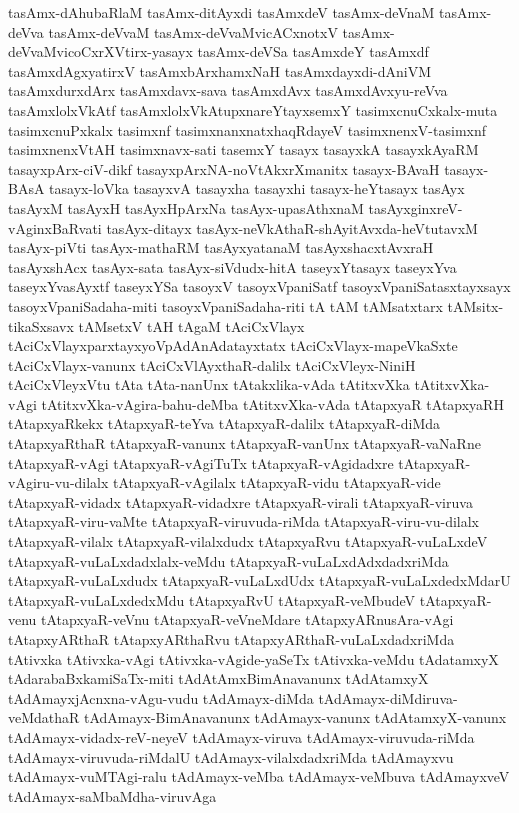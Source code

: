 {tasAmx-dAhubaRlaM
tasAmx-ditAyxdi
tasAmxdeV
tasAmx-deVnaM
tasAmx-deVva
tasAmx-deVvaM
tasAmx-deVvaMvicACxnotxV
tasAmx-deVvaMvicoCxrXVtirx-yasayx
tasAmx-deVSa
tasAmxdeY
tasAmxdf
tasAmxdAgxyatirxV
tasAmxbArxhamxNaH
tasAmxdayxdi-dAniVM
tasAmxdurxdArx
tasAmxdavx-sava
tasAmxdAvx
tasAmxdAvxyu-reVva
tasAmxlolxVkAtf
tasAmxlolxVkAtupxnareYtayxsemxY
tasimxcnuCxkalx-muta
tasimxcnuPxkalx
tasimxnf
tasimxnanxnatxhaqRdayeV
tasimxnenxV-tasimxnf
tasimxnenxVtAH
tasimxnavx-sati
tasemxY
tasayx
tasayxkA
tasayxkAyaRM
tasayxpArx-ciV-dikf
tasayxpArxNA-noVtAkxrXmanitx
tasayx-BAvaH
tasayx-BAsA
tasayx-loVka
tasayxvA
tasayxha
tasayxhi
tasayx-heYtasayx
tasAyx
tasAyxM
tasAyxH
tasAyxHpArxNa
tasAyx-upasAthxnaM
tasAyxginxreV-vAginxBaRvati
tasAyx-ditayx
tasAyx-neVkAthaR-shAyitAvxda-heVtutavxM
tasAyx-piVti
tasAyx-mathaRM
tasAyxyatanaM
tasAyxshacxtAvxraH
tasAyxshAcx
tasAyx-sata
tasAyx-siVdudx-hitA
taseyxYtasayx
taseyxYva
taseyxYvasAyxtf
taseyxYSa
tasoyxV
tasoyxVpaniSatf
tasoyxVpaniSatasxtayxsayx
tasoyxVpaniSadaha-miti
tasoyxVpaniSadaha-riti
tA
tAM
tAMsatxtarx
tAMsitx-tikaSxsavx
tAMsetxV
tAH
tAgaM
tAciCxVlayx
tAciCxVlayxparxtayxyoVpAdAnAdatayxtatx
tAciCxVlayx-mapeVkaSxte
tAciCxVlayx-vanunx
tAciCxVlAyxthaR-dalilx
tAciCxVleyx-NiniH
tAciCxVleyxVtu
tAta
tAta-nanUnx
tAtakxlika-vAda
tAtitxvXka
tAtitxvXka-vAgi
tAtitxvXka-vAgira-bahu-deMba
tAtitxvXka-vAda
tAtapxyaR
tAtapxyaRH
tAtapxyaRkekx
tAtapxyaR-teYva
tAtapxyaR-dalilx
tAtapxyaR-diMda
tAtapxyaRthaR
tAtapxyaR-vanunx
tAtapxyaR-vanUnx
tAtapxyaR-vaNaRne
tAtapxyaR-vAgi
tAtapxyaR-vAgiTuTx
tAtapxyaR-vAgidadxre
tAtapxyaR-vAgiru-vu-dilalx
tAtapxyaR-vAgilalx
tAtapxyaR-vidu
tAtapxyaR-vide
tAtapxyaR-vidadx
tAtapxyaR-vidadxre
tAtapxyaR-virali
tAtapxyaR-viruva
tAtapxyaR-viru-vaMte
tAtapxyaR-viruvuda-riMda
tAtapxyaR-viru-vu-dilalx
tAtapxyaR-vilalx
tAtapxyaR-vilalxdudx
tAtapxyaRvu
tAtapxyaR-vuLaLxdeV
tAtapxyaR-vuLaLxdadxlalx-veMdu
tAtapxyaR-vuLaLxdAdxdadxriMda
tAtapxyaR-vuLaLxdudx
tAtapxyaR-vuLaLxdUdx
tAtapxyaR-vuLaLxdedxMdarU
tAtapxyaR-vuLaLxdedxMdu
tAtapxyaRvU
tAtapxyaR-veMbudeV
tAtapxyaR-venu
tAtapxyaR-veVnu
tAtapxyaR-veVneMdare
tAtapxyARnusAra-vAgi
tAtapxyARthaR
tAtapxyARthaRvu
tAtapxyARthaR-vuLaLxdadxriMda
tAtivxka
tAtivxka-vAgi
tAtivxka-vAgide-yaSeTx
tAtivxka-veMdu
tAdatamxyX
tAdarabaBxkamiSaTx-miti
tAdAtAmxBimAnavanunx
tAdAtamxyX
tAdAmayxjAcnxna-vAgu-vudu
tAdAmayx-diMda
tAdAmayx-diMdiruva-veMdathaR
tAdAmayx-BimAnavanunx
tAdAmayx-vanunx
tAdAtamxyX-vanunx
tAdAmayx-vidadx-reV-neyeV
tAdAmayx-viruva
tAdAmayx-viruvuda-riMda
tAdAmayx-viruvuda-riMdalU
tAdAmayx-vilalxdadxriMda
tAdAmayxvu
tAdAmayx-vuMTAgi-ralu
tAdAmayx-veMba
tAdAmayx-veMbuva
tAdAmayxveV
tAdAmayx-saMbaMdha-viruvAga
}
